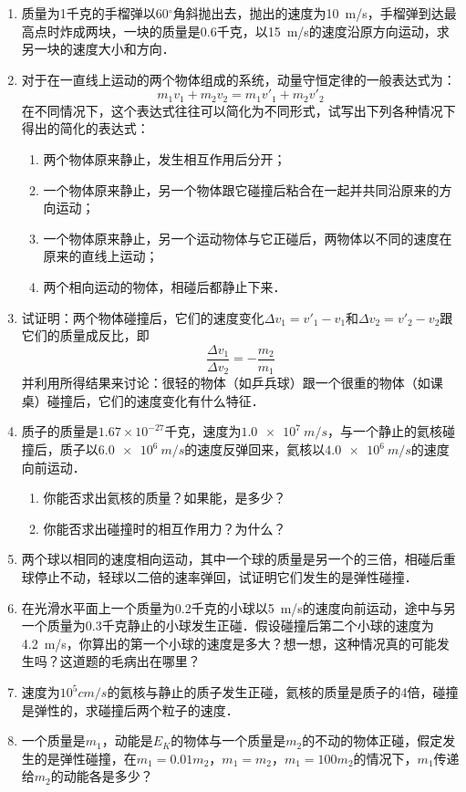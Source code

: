 \newpage
\begin{exercises}
\begin{enumerate}
    \item 质量为1千克的手榴弹以60$^\circ$角斜抛出去，抛出的速度为\qty{10}{m/s}，手榴弹到达最高点时炸成两块，一块的质量是0.6千克，以\qty{15}{m/s}的速度沿原方向运动，求另一块的速度大小和方向．
    \item 对于在一直线上运动的两个物体组成的系统，动量守恒定律的一般表达式为：
          \[m_1v_1+m_2v_2=m_1v'_1+m_2v'_2 \]
          在不同情况下，这个表达式往往可以简化为不同形式，试写出下列各种情况下得出的简化的表达式：
          \begin{enumerate}
              \item 两个物体原来静止，发生相互作用后分开；
              \item 一个物体原来静止，另一个物体跟它碰撞后粘合在一起并共同沿原来的方向运动；
              \item 一个物体原来静止，另一个运动物体与它正碰后，两物体以不同的速度在原来的直线上运动；
              \item 两个相向运动的物体，相碰后都静止下来．
          \end{enumerate}
    \item 试证明：两个物体碰撞后，它们的速度变化$\Delta v_1=v'_1-v_1$和$\Delta v_2=v'_2-v_2$跟它们的质量成反比，即
          \[\frac{\Delta v_1}{\Delta v_2}=-\frac{m_2}{m_1}\]
          并利用所得结果来讨论：很轻的物体（如乒兵球）跟一个很重的物体（如课桌）碰撞后，它们的速度变化有什么特征．
    \item 质子的质量是$1.67\times 10^{-27}$千克，速度为$\qty{1.0e7}{m/s}$，与一个静止的氦核碰撞后，质子以$\qty{6.0e6}{m/s}$的速度反弹回来，氦核以$\qty{4.0e6}{m/s}$的速度向前运动．
          \begin{enumerate}
              \item 你能否求出氦核的质量？如果能，是多少？
              \item 你能否求出碰撞时的相互作用力？为什么？
          \end{enumerate}
    \item 两个球以相同的速度相向运动，其中一个球的质量是另一个的三倍，相碰后重球停止不动，轻球以二倍的速率弹回，试证明它们发生的是弹性碰撞．
    \item 在光滑水平面上一个质量为0.2千克的小球以\qty{5}{m/s}的速度向前运动，途中与另一个质量为0.3千克静止的小球发生正碰．假设碰撞后第二个小球的速度为\qty{4.2}{m/s}，你算出的第一个小球的速度是多大？想一想，这种情况真的可能发生吗？这道题的毛病出在哪里？
    \item 速度为$10^5{ cm}/{ s}$的氦核与静止的质子发生正碰，氦核的质量是质子的4倍，碰撞是弹性的，求碰撞后两个粒子的速度．
    \item 一个质量是$m_1$，动能是$E_K$的物体与一个质量是$m_2$的不动的物体正碰，假定发生的是弹性碰撞，在$m_1=0.01m_2$，$m_1=m_2$，$m_1=100m_2$的情况下，$m_1$传递给$m_2$的动能各是多少？


\end{enumerate}
\end{exercises}
